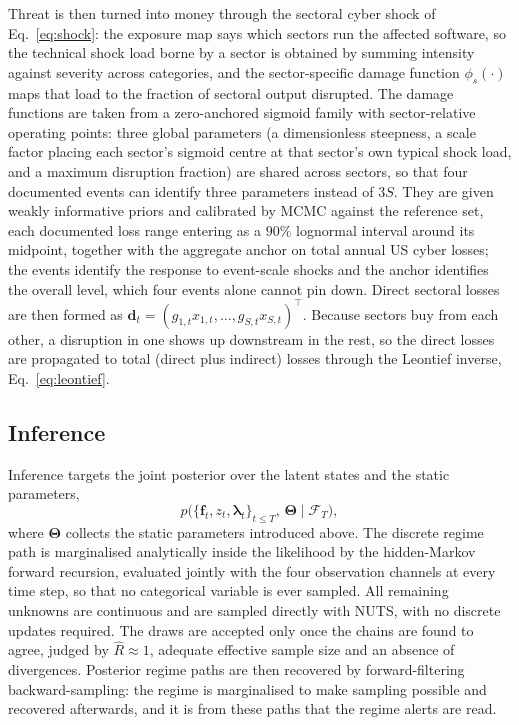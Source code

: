 \documentclass[review]{elsarticle}
\begin{document}
Threat is then turned into money through the sectoral cyber shock of Eq.~\ref{eq:shock}: the exposure map says which sectors run the affected software, so the technical shock load borne by a sector is obtained by summing intensity against severity across categories, and the sector-specific damage function $\phi_s(\cdot)$ maps that load to the fraction of sectoral output disrupted. The damage functions are taken from a zero-anchored sigmoid family with sector-relative operating points: three global parameters (a dimensionless steepness, a scale factor placing each sector's sigmoid centre at that sector's own typical shock load, and a maximum disruption fraction) are shared across sectors, so that four documented events can identify three parameters instead of $3S$. They are given weakly informative priors and calibrated by MCMC against the reference set, each documented loss range entering as a $90\%$ lognormal interval around its midpoint, together with the aggregate anchor on total annual US cyber losses; the events identify the response to event-scale shocks and the anchor identifies the overall level, which four events alone cannot pin down. Direct sectoral losses are then formed as $\bm{d}_t = (g_{1,t} x_{1,t}, \dots, g_{S,t} x_{S,t})^\top$. Because sectors buy from each other, a disruption in one shows up downstream in the rest, so the direct losses are propagated to total (direct plus indirect) losses through the Leontief inverse, Eq.~\ref{eq:leontief}.

\subsection{Inference}

Inference targets the joint posterior over the latent states and the static parameters,
\[
    p\big( \{\bm{f}_t, z_t, \bm{\lambda}_t\}_{t \le T},\, \bm{\Theta} \mid \mathcal{F}_T \big),
\]
where $\bm{\Theta}$ collects the static parameters introduced above. The discrete regime path is marginalised analytically inside the likelihood by the hidden-Markov forward recursion, evaluated jointly with the four observation channels at every time step, so that no categorical variable is ever sampled. All remaining unknowns are continuous and are sampled directly with NUTS, with no discrete updates required. The draws are accepted only once the chains are found to agree, judged by $\widehat{R} \approx 1$, adequate effective sample size and an absence of divergences. Posterior regime paths are then recovered by forward-filtering backward-sampling: the regime is marginalised to make sampling possible and recovered afterwards, and it is from these paths that the regime alerts are read.
\end{document}

